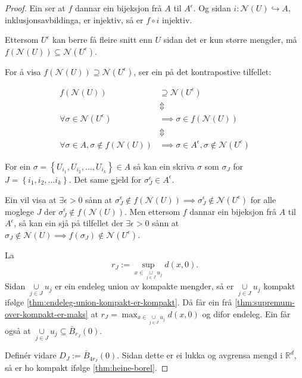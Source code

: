 \documentclass[a4paper, 12pt, norsk]{article}
\theoremstyle{plain}
\theoremstyle{definition}
\newcommand{\Rb}{\mathbb{R}}
\newcommand{\Nc}{\mathcal{N}}
\newcommand{\union}{ \mathop{\cup}\limits }
\newcommand{\set}[1]{ \left\{ #1 \right\} } %
\begin{document}
\begin{proof}
	 Ein ser at \( f \) dannar ein bijeksjon frå \( A \) til \( A^\epsilon \). Og sidan \( i: \Nc(U) \hookrightarrow A \), inklusjonsavbildinga, er injektiv, så er \( f \circ i \) injektiv.

	Ettersom \( U^{\epsilon} \) kan berre få fleire snitt enn \( U \) sidan det er kun større mengder, må \( f(\Nc(U)) \subseteq \Nc(U^{\epsilon}) \).
	
	For å visa \( f(\Nc(U)) \supseteq \Nc(U^{\epsilon}) \), ser ein på det kontrapostive tilfellet:
	 
	\begin{align*}
		f(\Nc(U)) &\supseteq \Nc(U^{\epsilon}) \\
		&\Updownarrow \\ 
		\forall \sigma \in \Nc(U^{\epsilon}) &\implies \sigma \in f(\Nc(U)) \\
		&\Updownarrow \\
		\forall \sigma \in A, \sigma \not\in f(\Nc(U)) &\implies \sigma \in A^\epsilon, \sigma \not\in \Nc(U^{\epsilon})
	\end{align*}

	For ein \( \sigma = \set{U_{i_1}, U_{i_2}, \dots, U_{i_k}} \in A \) så kan ein skriva \( \sigma \) som \( \sigma_J \) for \( J = \set{i_1, i_2, \dots i_k} \). Det same gjeld for \( \sigma^\epsilon_J \in A^\epsilon \). 
	
	Ein vil visa at \( \exists \epsilon > 0 \) sånn at \( \sigma^\epsilon_J \not\in f(\Nc(U)) \implies \sigma^\epsilon_J \not\in \Nc(U^{\epsilon}) \) for alle moglege \( J \) der \( \sigma^\epsilon_J \not\in f(\Nc(U)) \). Men ettersom \( f \) dannar ein bijeksjon frå \( A \) til \( A^\epsilon \), så kan ein sjå på tilfellet der \( \exists \epsilon > 0 \) sånn at \( \sigma_J \not\in \Nc(U) \implies f(\sigma_J) \not\in \Nc(U^{\epsilon}) \).

	La
	\[
		r_J := \sup_{x \in \union_{j \in J} u_j} d(x,0).
	\]
	Sidan \( \union_{j \in J} u_j \) er ein endeleg union av kompakte mengder, så er \( \union_{j \in J} u_j \) kompakt ifølge \autoref{thm:endeleg-union-kompakt-er-kompakt}. Då får ein frå \autoref{thm:supremum-over-kompakt-er-maks} at \( r_J = \max_{x \in \union_{j \in J} u_j} d(x,0) \) og difor endeleg. Ein får også at \( \union_{j \in J} u_j \subseteq \bar{B}_{r_J}(0) \).
	
	Definér vidare \( D_J := \bar{B}_{4r_J}(0) \). Sidan dette er ei lukka og avgrensa mengd i \( \Rb^d \), så er ho kompakt ifølge \autoref{thm:heine-borel}.


\end{proof}
\end{document}
